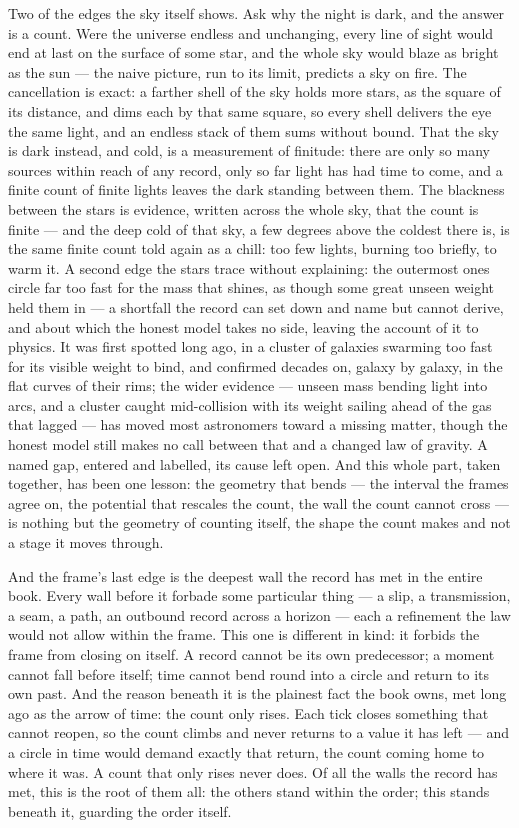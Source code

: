 Two of the edges the sky itself shows. Ask why the night is dark, and the answer is a count. Were the universe
endless and unchanging, every line of sight would end at last on the surface of some star, and the whole sky
would blaze as bright as the sun --- the naive picture, run to its limit, predicts a sky on fire. The
cancellation is exact: a farther shell of the sky holds more stars, as the square of its distance, and dims each
by that same square, so every shell delivers the eye the same light, and an endless stack of them sums without
bound. That the sky is dark instead, and cold, is a measurement of finitude: there are only so many sources
within reach of any record, only so far light has had time to come, and a finite count of finite lights leaves
the dark standing between them. The blackness between the stars is evidence, written across the whole sky, that
the count is finite --- and the deep cold of that sky, a few degrees above the coldest there is, is the same
finite count told again as a chill: too few lights, burning too briefly, to warm it. A second edge the stars trace without explaining: the outermost ones circle far too fast for the mass
that shines, as though some great unseen weight held them in --- a shortfall the record can set down and name
but cannot derive, and about which the honest model takes no side, leaving the account of it to physics. It was
first spotted long ago, in a cluster of galaxies swarming too fast for its visible weight to bind, and confirmed
decades on, galaxy by galaxy, in the flat curves of their rims; the wider evidence --- unseen mass bending light
into arcs, and a cluster caught mid-collision with its weight sailing ahead of the gas that lagged --- has moved
most astronomers toward a missing matter, though the honest model still makes no call between that and a changed
law of gravity. A named gap, entered and labelled, its cause left open. And this whole part, taken together, has been one lesson: the
geometry that bends --- the interval the frames agree on, the potential that rescales the count, the wall the
count cannot cross --- is nothing but the geometry of counting itself, the shape the count makes and not a stage
it moves through.

And the frame's last edge is the deepest wall the record has met in the entire book. Every wall before it
forbade some particular thing --- a slip, a transmission, a seam, a path, an outbound record across a horizon
--- each a refinement the law would not allow within the frame. This one is different in kind: it forbids the
frame from closing on itself. A record cannot be its own predecessor; a moment cannot fall before itself; time
cannot bend round into a circle and return to its own past. And the reason beneath it is the plainest fact the
book owns, met long ago as the arrow of time: the count only rises. Each tick closes something that cannot
reopen, so the count climbs and never returns to a value it has left --- and a circle in time would demand
exactly that return, the count coming home to where it was. A count that only rises never does. Of all the walls
the record has met, this is the root of them all: the others stand within the order; this stands beneath it,
guarding the order itself.


